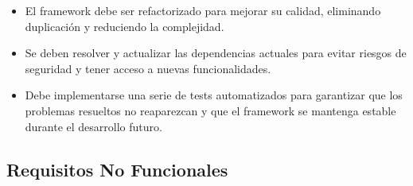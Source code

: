 \begin{itemize}
          \begin{itemize}
              \item El \gls{framework} debe ser refactorizado para mejorar su calidad, eliminando duplicación y reduciendo la complejidad.
              \item Se deben resolver y actualizar las dependencias actuales para evitar riesgos de seguridad y tener acceso a nuevas funcionalidades.
              \item Debe implementarse una serie de tests automatizados para garantizar que los problemas resueltos no reaparezcan y que el \gls{framework} se mantenga estable durante el desarrollo futuro.
          \end{itemize}
\end{itemize}

\subsection{Requisitos No Funcionales}
